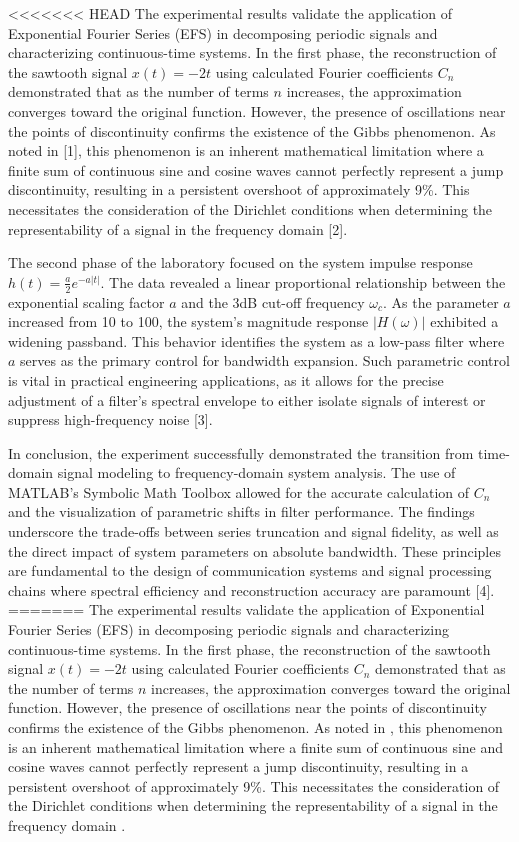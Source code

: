 <<<<<<< HEAD
The experimental results validate the application of Exponential Fourier Series (EFS) in decomposing periodic signals and characterizing continuous-time systems. In the first phase, the reconstruction of the sawtooth signal $x(t) = -2t$ using calculated Fourier coefficients $C_n$ demonstrated that as the number of terms $n$ increases, the approximation converges toward the original function. However, the presence of oscillations near the points of discontinuity confirms the existence of the Gibbs phenomenon. As noted in [1], this phenomenon is an inherent mathematical limitation where a finite sum of continuous sine and cosine waves cannot perfectly represent a jump discontinuity, resulting in a persistent overshoot of approximately 9\%. This necessitates the consideration of the Dirichlet conditions when determining the representability of a signal in the frequency domain [2].

The second phase of the laboratory focused on the system impulse response $h(t) = \frac{a}{2}e^{-a|t|}$. The data revealed a linear proportional relationship between the exponential scaling factor $a$ and the 3dB cut-off frequency $\omega_c$. As the parameter $a$ increased from 10 to 100, the system's magnitude response $|H(\omega)|$ exhibited a widening passband. This behavior identifies the system as a low-pass filter where $a$ serves as the primary control for bandwidth expansion. Such parametric control is vital in practical engineering applications, as it allows for the precise adjustment of a filter’s spectral envelope to either isolate signals of interest or suppress high-frequency noise [3].

In conclusion, the experiment successfully demonstrated the transition from time-domain signal modeling to frequency-domain system analysis. The use of MATLAB's Symbolic Math Toolbox allowed for the accurate calculation of $C_n$ and the visualization of parametric shifts in filter performance. The findings underscore the trade-offs between series truncation and signal fidelity, as well as the direct impact of system parameters on absolute bandwidth. These principles are fundamental to the design of communication systems and signal processing chains where spectral efficiency and reconstruction accuracy are paramount [4].
=======
The experimental results validate the application of Exponential Fourier Series (EFS) in decomposing periodic signals and characterizing continuous-time systems. In the first phase, the reconstruction of the sawtooth signal $x(t) = -2t$ using calculated Fourier coefficients $C_n$ demonstrated that as the number of terms $n$ increases, the approximation converges toward the original function. However, the presence of oscillations near the points of discontinuity confirms the existence of the Gibbs phenomenon. As noted in \cite{oppenheim1997}, this phenomenon is an inherent mathematical limitation where a finite sum of continuous sine and cosine waves cannot perfectly represent a jump discontinuity, resulting in a persistent overshoot of approximately 9\%. This necessitates the consideration of the Dirichlet conditions when determining the representability of a signal in the frequency domain \cite{haykin1999}.

